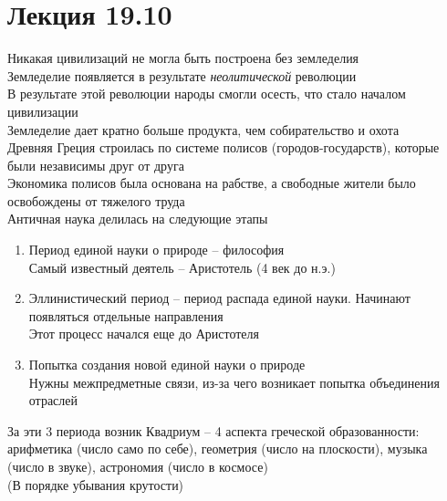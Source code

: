 \documentclass[12pt]{article}
\begin{document}
\section{Лекция 19.10}
Никакая цивилизаций не могла быть построена без земледелия\\
Земледелие появляется в результате \textit{неолитической} революции\\
В результате этой революции народы смогли осесть, что стало началом цивилизации\\
Земледелие дает кратно больше продукта, чем собирательство и охота\\
Древняя Греция строилась по системе полисов (городов-государств), которые были независимы друг от друга\\
Экономика полисов была основана на рабстве, а свободные жители было освобождены от тяжелого труда\\
Античная наука делилась на следующие этапы
\begin{enumerate}
    \item Период единой науки о природе -- философия\\
    Самый известный деятель -- Аристотель (4 век до н.э.)
    \item Эллинистический период -- период распада единой науки. Начинают появляться отдельные направления\\
    Этот процесс начался еще до Аристотеля
    \item Попытка создания новой единой науки о природе\\
    Нужны межпредметные связи, из-за чего возникает попытка объединения отраслей
\end{enumerate}
За эти 3 периода возник Квадриум -- 4 аспекта греческой образованности: арифметика (число само по себе), геометрия (число на плоскости), музыка (число в звуке), астрономия (число в космосе)\\
(В порядке убывания крутости)
\end{document}
